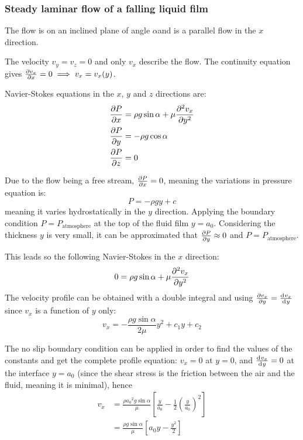 \documentclass[10pt, twocolumn]{article}
\begin{document}


\subsubsection{Steady laminar flow of a falling liquid film}
The flow is on an inclined plane of angle \(\alpha\)and is a parallel flow in the \(x\) direction.

The velocity \(v_y = v_z = 0\) and only \(v_x\) describe the flow.
The continuity equation gives \(\frac{\partial v_x}{\partial x} = 0 \implies v_x = v_x(y)\).

Navier-Stokes equations in the \(x\), \(y\) and \(z\) directions are:
\begin{align*}
  \frac{\partial P}{\partial x} & = \rho g \sin\alpha + \mu \frac{\partial^{2} v_x}{\partial y^{2}} \\
  \frac{\partial P}{\partial y} & = -\rho g \cos\alpha                                     \\
  \frac{\partial P}{\partial z} & = 0
\end{align*}

Due to the flow being a free stream, \(\frac{\partial P}{\partial x} = 0\), meaning the variations in pressure equation is:
\[
  P = -\rho g y + c
\]
meaning it varies hydrostatically in the \(y\) direction.
Applying the boundary condition \(P = P_\mathrm{atmosphere}\) at the top of the fluid film \(y = a_0\).
Considering the thickness \(y\) is very small, it can be approximated that \(\frac{\partial P}{\partial y} \approx 0\) and \(P = P_\mathrm{atmosphere}\).

This leads so the following Navier-Stokes in the \(x\) direction:
\[
  0 = \rho g \sin\alpha + \mu \frac{\partial^{2} v_x}{\partial y^{2}}
\]
The velocity profile can be obtained with a double integral and using \(\frac{\partial v_x}{\partial y} = \frac{\mathrm{d}^{} v_x}{\mathrm{d}^{} y}\) since \(v_x\) is a function of \(y\) only:
\[
  v_x = -\frac{\rho g \sin\alpha}{2 \mu} y^2 + c_1 y + c_2
\]

The no slip boundary condition can be applied in order to find the values of the constants and get the complete profile equation: \(v_x = 0\) at \(y = 0\), and \(\frac{\mathrm{d}^{} v_x}{\mathrm{d}^{} y} = 0\) at the interface \(y = a_0\) (since the shear stress is the friction between the air and the fluid, meaning it is minimal), hence
\begin{align*}
  v_x & = \frac{\rho {a_0}^2 g \sin\alpha}{\mu} \left[ \frac{y}{a_0} - \frac{1}{2}\left( \frac{y}{a_0} \right)^2 \right] \\
      & = \frac{\rho g \sin\alpha}{\mu} \left[ a_0 y - \frac{y^2 }{2}\right]
\end{align*}
\end{document}
